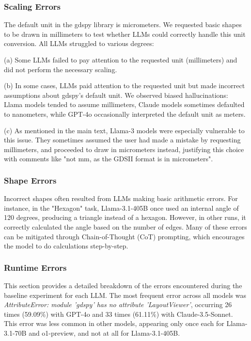 \documentclass{article}
\begin{document}
\subsubsection{Scaling Errors}
\label{appendix:scaling_errors}

The default unit in the gdspy library is micrometers. We requested basic shapes to be drawn in millimeters to test whether LLMs could correctly handle this unit conversion. All LLMs struggled to various degrees:

(a) Some LLMs failed to pay attention to the requested unit (millimeters) and did not perform the necessary scaling.

(b) In some cases, LLMs paid attention to the requested unit but made incorrect assumptions about gdspy's default unit. We observed biased hallucinations: Llama models tended to assume millimeters, Claude models sometimes defaulted to nanometers, while GPT-4o occasionally interpreted the default unit as meters.

(c) As mentioned in the main text, Llama-3 models were especially vulnerable to this issue. They sometimes assumed the user had made a mistake by requesting millimeters, and proceeded to draw in micrometers instead, justifying this choice with comments like "not mm, as the GDSII format is in micrometers".

\subsubsection{Shape Errors}
\label{appendix:shape_errors}

Incorrect shapes often resulted from LLMs making basic arithmetic errors. For instance, in the "Hexagon" task, Llama-3.1-405B once used an internal angle of 120 degrees, producing a triangle instead of a hexagon. However, in other runs, it correctly calculated the angle based on the number of edges. Many of these errors can be mitigated through Chain-of-Thought (CoT) prompting, which encourages the model to do calculations step-by-step.

\subsubsection{Runtime Errors}
\label{appendix:runtime_errors}

This section provides a detailed breakdown of the errors encountered during the baseline experiment for each LLM. The most frequent error across all models was \textit{AttributeError: module 'gdspy' has no attribute 'LayoutViewer'}, occurring 26 times (59.09\%) with GPT-4o and 33 times (61.11\%) with Claude-3.5-Sonnet. This error was less common in other models, appearing only once each for Llama-3.1-70B and o1-preview, and not at all for Llama-3.1-405B.
\end{document}
